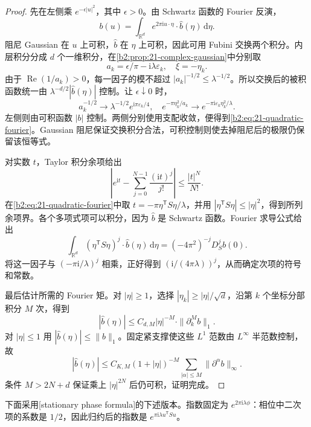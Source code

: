 \begin{proof}
先在左侧乘 \(e^{-\epsilon|u|^2}\)，其中 \(\epsilon>0\)。由 Schwartz 函数的 Fourier 反演，
\[
 b(u)=\int_{\mathbb R^d}e^{2\pi\mathrm i u\cdot\eta}
                  \cdot\widehat b(\eta)\,\mathrm d\eta.
\]
阻尼 Gaussian 在 \(u\) 上可积，\(\widehat b\) 在 \(\eta\) 上可积，因此可用 Fubini 交换两个积分。内层积分分成 \(d\) 个一维积分，在\cref{b2:prop:21-complex-gaussian}中分别取
\[
 a_k=\epsilon/\pi-\mathrm i\lambda\varepsilon_k,
 \quad \xi=-\eta_k.
\]
由于 \(\operatorname{Re}(1/a_k)>0\)，每一因子的模不超过
\(|a_k|^{-1/2}\leq\lambda^{-1/2}\)。所以交换后的被积函数统一由
\(\lambda^{-d/2}|\widehat b(\eta)|\) 控制。让 \(\epsilon\downarrow0\) 时，
\[
 a_k^{-1/2}\longrightarrow
        \lambda^{-1/2}e^{\mathrm i\pi\varepsilon_k/4},
 \quad
 e^{-\pi\eta_k^2/a_k}\longrightarrow
        e^{-\pi\mathrm i\varepsilon_k\eta_k^2/\lambda}.
\]
左侧则由可积函数 \(|b|\) 控制。两侧分别使用支配收敛，便得到\cref{b2:eq:21-quadratic-fourier}。Gaussian 阻尼保证交换积分合法，可积控制则使去掉阻尼后的极限仍保留该恒等式。

对实数 \(t\)，Taylor 积分余项给出
\[
 \left|e^{\mathrm it}
       -\sum_{j=0}^{N-1}\frac{(\mathrm it)^j}{j!}\right|
 \leq\frac{|t|^N}{N!}.
\]
在\cref{b2:eq:21-quadratic-fourier}中取
\(t=-\pi\eta^{\mathsf T}S\eta/\lambda\)，并用
\(|\eta^{\mathsf T}S\eta|\leq|\eta|^2\)，得到所列余项界。各个多项式项可以积分，因为 \(\widehat b\) 是 Schwartz 函数。Fourier 求导公式给出
\[
 \int_{\mathbb R^d}(\eta^{\mathsf T}S\eta)^j
                   \cdot\widehat b(\eta)\,\mathrm d\eta
 =(-4\pi^2)^{-j}D_S^jb(0).
\]
将这一因子与 \((-\pi\mathrm i/\lambda)^j\) 相乘，正好得到
\((\mathrm i/(4\pi\lambda))^j\)，从而确定次项的符号和常数。

最后估计所需的 Fourier 矩。对 \(|\eta|\geq1\)，选择
\(|\eta_k|\geq|\eta|/\sqrt d\)，沿第 \(k\) 个坐标分部积分 \(M\) 次，得到
\[
 |\widehat b(\eta)|
 \leq C_{d,M}|\eta|^{-M}\cdot\|\partial_k^Mb\|_1.
\]
对 \(|\eta|\leq1\) 用 \(|\widehat b(\eta)|\leq\|b\|_1\)。固定紧支撑使这些 \(L^1\) 范数由 \(L^\infty\) 半范数控制，故
\[
 |\widehat b(\eta)|
 \leq C_{K,M}(1+|\eta|)^{-M}
       \sum_{|\alpha|\leq M}\|\partial^\alpha b\|_\infty.
\]
条件 \(M>2N+d\) 保证乘上 \(|\eta|^{2N}\) 后仍可积，证明完成。
\end{proof}

下面采用[stationary phase formula]的下述版本。指数固定为 \(e^{2\pi\mathrm i\lambda\phi}\)：相位中二次项的系数是 \(1/2\)，因此归约后的指数是 \(e^{\pi\mathrm i\lambda u^{\mathsf T}Su}\)。

